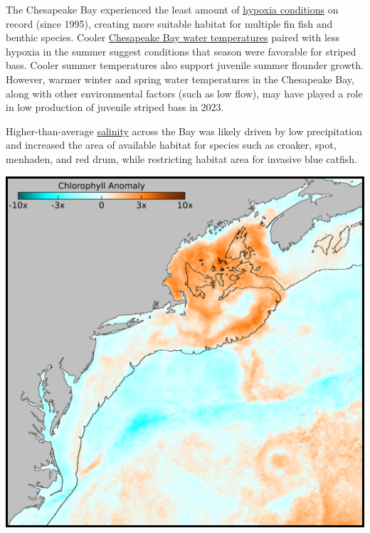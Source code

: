\documentclass[
  10pt,
]{article}
\let\origfigure\figure
\let\endorigfigure\endfigure
\renewenvironment{figure}[1][2] {
    \expandafter\origfigure\expandafter[H]
} {
    \endorigfigure
}
\begin{document}
The Chesapeake Bay experienced the least amount of \href{https://noaa-edab.github.io/catalog/ches_bay_synthesis.html}{hypoxia conditions} on record (since 1995), creating more suitable habitat for multiple fin fish and benthic species. Cooler \href{https://noaa-edab.github.io/catalog/ches_bay_sst.html}{Chesapeake Bay water temperatures} paired with less hypoxia in the summer suggest conditions that season were favorable for striped bass. Cooler summer temperatures also support juvenile summer flounder growth. However, warmer winter and spring water temperatures in the Chesapeake Bay, along with other environmental factors (such as low flow), may have played a role in low production of juvenile striped bass in 2023.

Higher-than-average \href{https://noaa-edab.github.io/catalog/ch_bay_sal.html}{salinity} across the Bay was likely driven by low precipitation and increased the area of available habitat for species such as croaker, spot, menhaden, and red drum, while restricting habitat area for invasive blue catfish.

\begin{figure}

{\centering \includegraphics[width=0.5\linewidth]{SOE-NEFMC_files/figure-latex/gom-bloom-2023-1} 

}

\caption{The chlorophyll anomaly for June 2023. Chlorophyll concentrations in the Gulf of Maine were 5-10 times greater than the long-term June average.}\label{fig:gom-bloom-2023}
\end{figure}
\end{document}
